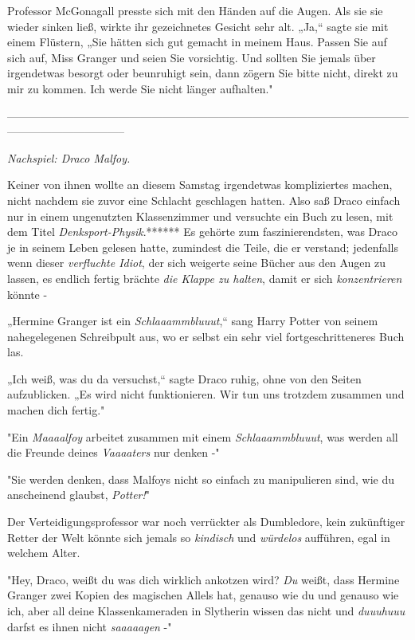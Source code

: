 {Professor McGonagall presste sich mit den Händen auf die Augen. Als sie sie wieder sinken ließ, wirkte ihr gezeichnetes Gesicht sehr alt. „Ja,“ sagte sie mit einem Flüstern, „Sie hätten sich gut gemacht in meinem Haus. Passen Sie auf sich auf, Miss Granger und seien Sie vorsichtig. Und sollten Sie jemals über irgendetwas besorgt oder beunruhigt sein, dann zögern Sie bitte nicht, direkt zu mir zu kommen. Ich werde Sie nicht länger aufhalten."

--------------------------------------------------------------------------------------------------------------------------------------------

\hfill\break \emph{Nachspiel: Draco Malfoy.}

Keiner von ihnen wollte an diesem Samstag irgendetwas kompliziertes machen, nicht nachdem sie zuvor eine Schlacht geschlagen hatten. Also saß Draco einfach nur in einem ungenutzten Klassenzimmer und versuchte ein Buch zu lesen, mit dem Titel \emph{Denksport-Physik}.****** Es gehörte zum faszinierendsten, was Draco je in seinem Leben gelesen hatte, zumindest die Teile, die er verstand; jedenfalls wenn dieser \emph{verfluchte Idiot}, der sich weigerte seine Bücher aus den Augen zu lassen, es endlich fertig brächte \emph{die Klappe zu halten}, damit er sich \emph{konzentrieren} könnte -

„Hermine Granger ist ein \emph{Schlaaammbluuut},“ sang Harry Potter von seinem nahegelegenen Schreibpult aus, wo er selbst ein sehr viel fortgeschritteneres Buch las.

„Ich weiß, was du da versuchst,“ sagte Draco ruhig, ohne von den Seiten aufzublicken. „Es wird nicht funktionieren. Wir tun uns trotzdem zusammen und machen dich fertig."

"Ein \emph{Maaaalfoy} arbeitet zusammen mit einem \emph{Schlaaammbluuut}, was werden all die Freunde deines \emph{Vaaaaters} nur denken -"

"Sie werden denken, dass Malfoys nicht so einfach zu manipulieren sind, wie du anscheinend glaubst, \emph{Potter!}"

Der Verteidigungsprofessor war noch verrückter als Dumbledore, kein zukünftiger Retter der Welt könnte sich jemals so \emph{kindisch} und \emph{würdelos} aufführen, egal in welchem Alter.

"Hey, Draco, weißt du was dich wirklich ankotzen wird? \emph{Du} weißt, dass Hermine Granger zwei Kopien des magischen Allels hat, genauso wie du und genauso wie ich, aber all deine Klassenkameraden in Slytherin wissen das nicht und \emph{duuuhuuu} darfst es ihnen nicht \emph{saaaaagen} -"

}
